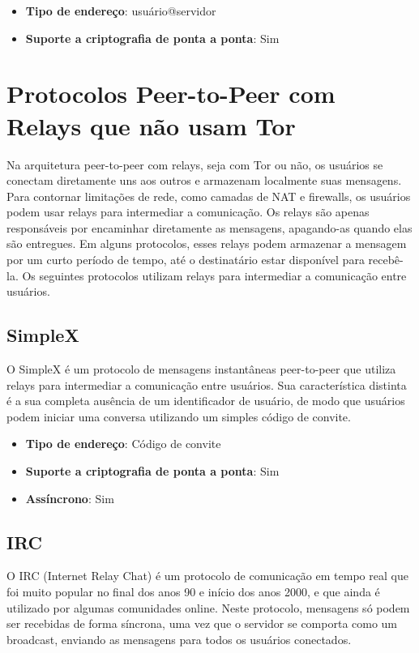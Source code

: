 \begin{itemize}
  \item \textbf{Tipo de endereço}: usuário@servidor
  \item \textbf{Suporte a criptografia de ponta a ponta}: Sim
\end{itemize}

\section{Protocolos Peer-to-Peer com Relays que não usam Tor}

Na arquitetura peer-to-peer com relays, seja com Tor ou não, os usuários se conectam diretamente uns aos outros e armazenam localmente suas mensagens. Para contornar limitações de rede, como camadas de NAT e firewalls, os usuários podem usar relays para intermediar a comunicação. Os relays são apenas responsáveis por encaminhar diretamente as mensagens, apagando-as quando elas são entregues. Em alguns protocolos, esses relays podem armazenar a mensagem por um curto período de tempo, até o destinatário estar disponível para recebê-la. Os seguintes protocolos utilizam relays para intermediar a comunicação entre usuários.

\subsection{SimpleX}

O SimpleX é um protocolo de mensagens instantâneas peer-to-peer que utiliza relays para intermediar a comunicação entre usuários. Sua característica distinta é a sua completa ausência de um identificador de usuário, de modo que usuários podem iniciar uma conversa utilizando um simples código de convite. \cite{simplex}

\begin{itemize}
  \item \textbf{Tipo de endereço}: Código de convite
  \item \textbf{Suporte a criptografia de ponta a ponta}: Sim
  \item \textbf{Assíncrono}: Sim
\end{itemize}

\subsection{IRC}

O IRC (Internet Relay Chat) é um protocolo de comunicação em tempo real que foi muito popular no final dos anos 90 e início dos anos 2000, e que ainda é utilizado por algumas comunidades online. Neste protocolo, mensagens só podem ser recebidas de forma síncrona, uma vez que o servidor se comporta como um broadcast, enviando as mensagens para todos os usuários conectados. \cite{rfc2810}


